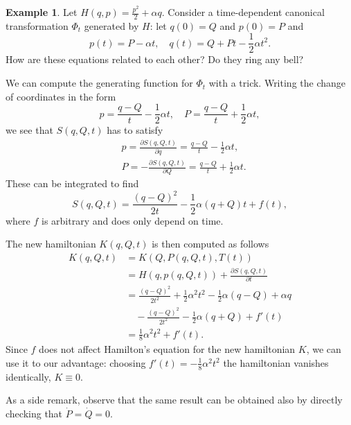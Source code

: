\documentclass[english,fontsize=11pt,paper=b5]{scrbook}
\theoremstyle{definition}
\newtheorem{example}{Example}[chapter]
\begin{document}
    \begin{example}
      Let $H(q,p) = \frac{p^2}{2} + \alpha q$. Consider a time-dependent canonical transformation $\Phi_t$ generated by $H$: let $q(0) = Q$ and $p(0) = P$ and
      \begin{equation}\label{eq:unifaccm}
        p(t) = P - \alpha t, \quad
        q(t) = Q + Pt - \frac{1}{2}\alpha t^2.
      \end{equation}
      How are these equations related to each other? Do they ring any bell?

      We can compute the generating function for $\Phi_t$ with a trick. Writing the change of coordinates in the form
      \begin{equation}
        p = \frac{q-Q}{t}-\frac12\alpha t, \quad
        P = \frac{q-Q}{t} + \frac 12\alpha t,
      \end{equation}
      we see that $S(q,Q,t)$ has to satisfy
      \begin{align}
     & p = \frac{\partial S(q,Q,t)}{\partial q} = \frac{q-Q}{t} - \frac12\alpha t,   \\
     & P = - \frac{\partial S(q,Q,t)}{\partial Q} = \frac{q-Q}{t} + \frac12\alpha t.
      \end{align}
      These can be integrated to find
      \begin{equation}
        S(q,Q,t) = \frac{(q-Q)^2}{2t} - \frac12 \alpha (q+Q) t + f(t),
      \end{equation}
      where $f$ is arbitrary and does only depend on time.

      The new hamiltonian $K(q,Q,t)$ is then computed as follows
      \begin{align}
        K(q,Q,t) & = K(Q, P(q,Q,t), T(t))                                                          \\
                 & = H(q, p(q,Q,t)) + \frac{\partial S (q,Q,t)}{\partial t}                        \\
                 & = \frac{(q-Q)^2}{2t^2} + \frac12 \alpha^2 t^2 - \frac12 \alpha (q-Q) + \alpha q \\
                 & \quad - \frac{(q-Q)^2}{2t^2} - \frac12 \alpha(q+Q) + f'(t)                      \\
                 & = \frac{1}{8}\alpha^2t^2 + f'(t).
      \end{align}
      Since $f$ does not affect Hamilton's equation for the new hamiltonian $K$, we can use it to our advantage: choosing $f'(t) = - \frac{1}{8}\alpha^2t^2$ the hamiltonian vanishes identically, $K\equiv 0$.

      As a side remark, observe that the same result can be obtained also by directly checking that $\dot P = \dot Q = 0$.
    \end{example}
\end{document}
